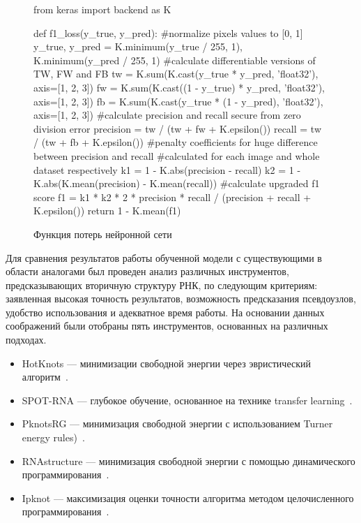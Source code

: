 \begin{figure}[h]
\begin{center}
\centering
\begin{python}
from keras import backend as K

def f1_loss(y_true, y_pred):
    #normalize pixels values to [0, 1]
    y_true, y_pred = K.minimum(y_true / 255, 1), K.minimum(y_pred / 255, 1)
    #calculate differentiable versions of TW, FW and FB
    tw = K.sum(K.cast(y_true * y_pred, 'float32'), axis=[1, 2, 3])
    fw = K.sum(K.cast((1 - y_true) * y_pred, 'float32'), axis=[1, 2, 3])
    fb = K.sum(K.cast(y_true * (1 - y_pred), 'float32'), axis=[1, 2, 3])
    #calculate precision and recall secure from zero division error
    precision = tw / (tw + fw + K.epsilon())
    recall = tw / (tw + fb + K.epsilon())
    #penalty coefficients for huge difference between precision and recall 
    #calculated for each image and whole dataset respectively
    k1 = 1 -  K.abs(precision - recall)
    k2 = 1 -  K.abs(K.mean(precision) - K.mean(recall))
    #calculate upgraded f1 score
    f1 = k1 * k2 * 2 * precision * recall / (precision + recall + K.epsilon()) 
    return 1 - K.mean(f1)
\end{python}
\caption{Функция потерь нейронной сети}
\label{loss}
\end{center}
\end{figure} 

Для сравнения результатов работы обученной модели с существующими в области аналогами был проведен анализ различных инструментов, предсказывающих вторичную структуру РНК, по следующим критериям: заявленная высокая точность результатов, возможность предсказания псевдоузлов, удобство использования и адекватное время работы. На основании данных соображений были отобраны пять инструментов, основанных на различных подходах.
\begin{itemize}
    \item HotKnots --- минимизации свободной энергии через эвристический алгоритм~\cite{ren2005hotknots}.
    \item SPOT-RNA --- глубокое обучение, основанное на технике transfer learning~\cite{singh2019rna}.
    \item PknotsRG --- минимизация свободной энергии с использованием Turner energy rules)~\cite{reeder2007pknotsrg}.
    \item RNAstructure --- минимизация свободной энергии с помощью динамического программирования~\cite{bellaousov2013rnastructure}.
    \item Ipknot --- максимизация оценки точности алгоритма методом целочисленного программирования~\cite{sato2011ipknot}.
\end{itemize}

